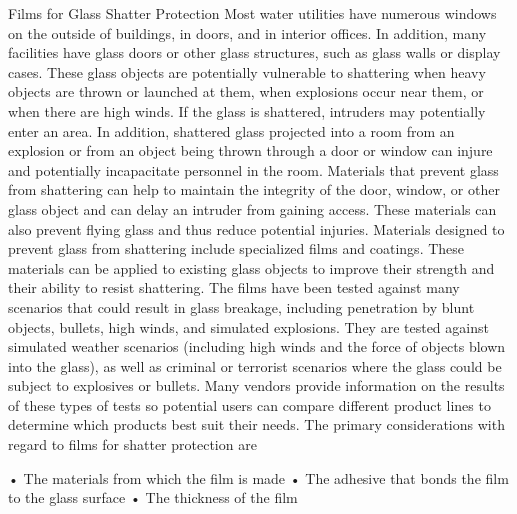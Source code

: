 \documentclass{article}
\begin{document}
Films for Glass Shatter Protection Most water utilities have numerous
windows on the outside of buildings, in doors, and in interior offices.
In addition, many facilities have glass doors or other glass structures,
such as glass walls or display cases. These glass objects are
potentially vulnerable to shattering when heavy objects are thrown or
launched at them, when explosions occur near them, or when there are
high winds. If the glass is shattered, intruders may potentially enter
an area. In addition, shattered glass projected into a room from an
explosion or from an object being thrown through a door or window can
injure and potentially incapacitate personnel in the room. Materials
that prevent glass from shattering can help to maintain the integrity of
the door, window, or other glass object and can delay an intruder from
gaining access. These materials can also prevent flying glass and thus
reduce potential injuries. Materials designed to prevent glass from
shattering include specialized films and coatings. These materials can
be applied to existing glass objects to improve their strength and their
ability to resist shattering. The films have been tested against many
scenarios that could result in glass breakage, including penetration by
blunt objects, bullets, high winds, and simulated explosions. They are
tested against simulated weather scenarios (including high winds and the
force of objects blown into the glass), as well as criminal or terrorist
scenarios where the glass could be subject to explosives or bullets.
Many vendors provide information on the results of these types of tests
so potential users can compare different product lines to determine
which products best suit their needs. The primary considerations with
regard to films for shatter protection are

• The materials from which the film is made • The adhesive that bonds
the film to the glass surface • The thickness of the film
\end{document}
